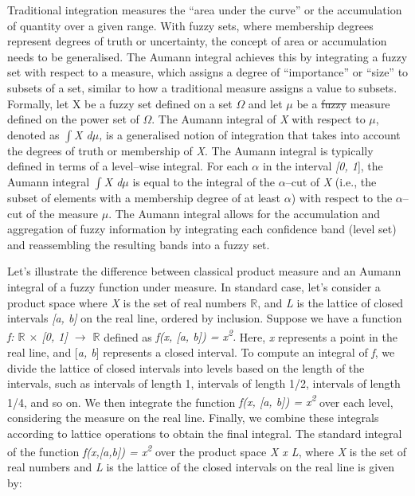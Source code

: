 \documentclass[12pt,a4paper]{report}
\numberwithin{equation}{section}
\begin{document}
Traditional integration measures the ``area under the curve'' or the
accumulation of quantity over a given range. With fuzzy sets, where
membership degrees represent degrees of truth or uncertainty, the
concept of area or accumulation needs to be generalised. The Aumann
integral achieves this by integrating a fuzzy set with respect to a
measure, which assigns a degree of ``importance'' or
``size'' to subsets of a set, similar to how a traditional measure
assigns a value to subsets. Formally, let X be a fuzzy set defined on a
set \emph{$\Omega$} and let \emph{$\mu$} be a \sout{fuzzy} measure defined on the
power set of \emph{$\Omega$}. The Aumann integral of \emph{X} with respect to
\emph{$\mu$}, denoted as \emph{$\int$X d$\mu$,} is a generalised notion of
integration that takes into account the degrees of truth or membership
of \emph{X}. The Aumann integral is typically defined in terms of a
level--wise integral. For each $\alpha$ in the interval \emph{{[}0, 1}{]}, the
Aumann integral \emph{$\int$X d$\mu$} is equal to the integral of the $\alpha$--cut of
\emph{X} (i.e., the subset of elements with a membership degree of at
least \emph{$\alpha$}) with respect to the $\alpha$--cut of the measure $\mu$.
The Aumann integral allows for the accumulation and aggregation of fuzzy
information by integrating each confidence band (level set) and
reassembling the resulting bands into a fuzzy set.

Let's illustrate the difference between classical product measure and an
Aumann integral of a fuzzy function under measure. In
standard case, let's consider a product space where \emph{X} is the set
of real numbers \emph{$\mathbb{R}$}, and \emph{L} is the lattice of closed
intervals \emph{{[}a, b{]}} on the real line, ordered by inclusion.
Suppose we have a function \emph{f: $\mathbb{R}$ $\times$ {[}0, 1{]} $\rightarrow$ $\mathbb{R}$} defined as
\emph{f(x, {[}a, b{]}) = x\textsuperscript{2}.} Here, \emph{x} represents a point in the
real line, and {[}\emph{a, b}{]} represents a closed interval. To
compute an integral of \emph{f}, we divide the lattice of closed
intervals into levels based on the length of the intervals, such as
intervals of length 1, intervals of length 1/2, intervals of length 1/4,
and so on. We then integrate the function \emph{f(x, {[}a, b{]}) = x\textsuperscript{2}}
over each level, considering the measure on the real line. Finally, we
combine these integrals according to lattice operations to obtain the
final integral. The standard integral of the function
\emph{f(x,{[}a,b{]}) = x\textsuperscript{2}} over the product space
\emph{X x L}, where \emph{X} is the set of real numbers and \emph{L} is
the lattice of the closed intervals on the real line is given by:
\end{document}
